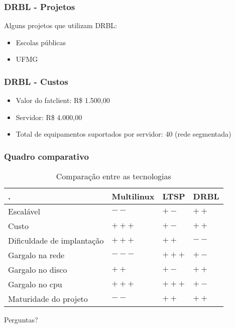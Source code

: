 \documentclass[utf8,9pt]{beamer}
\begin{document}
	  \begin{frame}
		  \frametitle{DRBL - Projetos}
		  Alguns projetos que utilizam DRBL:
		  \begin{itemize}
			  \item Escolas públicas 
			  \item UFMG
		  \end{itemize}
	  \end{frame}

	  \begin{frame}
		  \frametitle{DRBL - Custos}
		  \begin{itemize}
			  \item Valor do fatclient: R\$ 1.500,00
			  \item Servidor: R\$ 4.000,00
			  \item Total de equipamentos suportados por servidor: 40 (rede segmentada)
		  \end{itemize}
	  \end{frame}

	  \begin{frame}
		  \frametitle{Quadro comparativo}	
		  \begin{center}
			  \begin{table}[h!b!]
			  \begin{tabular}{llll}
			  \hline
			  . & Multilinux & LTSP & DRBL \\
			  \hline
			  Escalável & $--$ & $+-$ & $++$ \\
			  Custo & $+++$ & $+-$ & $++$ \\
			  Dificuldade de implantação & $+++$ & $++$ & $--$ \\
			  Gargalo na rede & $---$ & $+++$ & $+-$ \\
			  Gargalo no disco & $++$ & $+-$ & $++$ \\
			  Gargalo no cpu & $+++$ & $+++$ & $+-$\\
			  Maturidade do projeto & $--$ & $++$ & $++$\\
			  \hline
			  \end{tabular}
			  \caption{Comparação entre as tecnologias}
			  \end{table}
		  \end{center}
	  \end{frame}

	  \begin{frame}
		  \begin{center}
			  \Huge{Perguntas?}
		  \end{center}
	  \end{frame}
\end{document}
